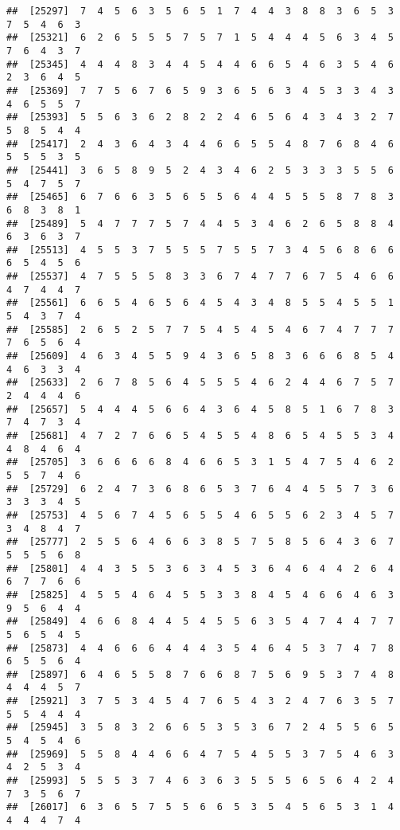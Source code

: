 \documentclass[
]{book}
\begin{document}
\begin{verbatim}
##  [25297]  7  4  5  6  3  5  6  5  1  7  4  4  3  8  8  3  6  5  3  7  5  4  6  3
##  [25321]  6  2  6  5  5  5  7  5  7  1  5  4  4  4  5  6  3  4  5  7  6  4  3  7
##  [25345]  4  4  4  8  3  4  4  5  4  4  6  6  5  4  6  3  5  4  6  2  3  6  4  5
##  [25369]  7  7  5  6  7  6  5  9  3  6  5  6  3  4  5  3  3  4  3  4  6  5  5  7
##  [25393]  5  5  6  3  6  2  8  2  2  4  6  5  6  4  3  4  3  2  7  5  8  5  4  4
##  [25417]  2  4  3  6  4  3  4  4  6  6  5  5  4  8  7  6  8  4  6  5  5  5  3  5
##  [25441]  3  6  5  8  9  5  2  4  3  4  6  2  5  3  3  3  5  5  6  5  4  7  5  7
##  [25465]  6  7  6  6  3  5  6  5  5  6  4  4  5  5  5  8  7  8  3  6  8  3  8  1
##  [25489]  5  4  7  7  7  5  7  4  4  5  3  4  6  2  6  5  8  8  4  6  3  6  3  7
##  [25513]  4  5  5  3  7  5  5  5  7  5  5  7  3  4  5  6  8  6  6  6  5  4  5  6
##  [25537]  4  7  5  5  5  8  3  3  6  7  4  7  7  6  7  5  4  6  6  4  7  4  4  7
##  [25561]  6  6  5  4  6  5  6  4  5  4  3  4  8  5  5  4  5  5  1  5  4  3  7  4
##  [25585]  2  6  5  2  5  7  7  5  4  5  4  5  4  6  7  4  7  7  7  7  6  5  6  4
##  [25609]  4  6  3  4  5  5  9  4  3  6  5  8  3  6  6  6  8  5  4  4  6  3  3  4
##  [25633]  2  6  7  8  5  6  4  5  5  5  4  6  2  4  4  6  7  5  7  2  4  4  4  6
##  [25657]  5  4  4  4  5  6  6  4  3  6  4  5  8  5  1  6  7  8  3  7  4  7  3  4
##  [25681]  4  7  2  7  6  6  5  4  5  5  4  8  6  5  4  5  5  3  4  4  8  4  6  4
##  [25705]  3  6  6  6  6  8  4  6  6  5  3  1  5  4  7  5  4  6  2  5  5  7  4  6
##  [25729]  6  2  4  7  3  6  8  6  5  3  7  6  4  4  5  5  7  3  6  3  3  3  4  5
##  [25753]  4  5  6  7  4  5  6  5  5  4  6  5  5  6  2  3  4  5  7  3  4  8  4  7
##  [25777]  2  5  5  6  4  6  6  3  8  5  7  5  8  5  6  4  3  6  7  5  5  5  6  8
##  [25801]  4  4  3  5  5  3  6  3  4  5  3  6  4  6  4  4  2  6  4  6  7  7  6  6
##  [25825]  4  5  5  4  6  4  5  5  3  3  8  4  5  4  6  6  4  6  3  9  5  6  4  4
##  [25849]  4  6  6  8  4  4  5  4  5  5  6  3  5  4  7  4  4  7  7  5  6  5  4  5
##  [25873]  4  4  6  6  6  4  4  4  3  5  4  6  4  5  3  7  4  7  8  6  5  5  6  4
##  [25897]  6  4  6  5  5  8  7  6  6  8  7  5  6  9  5  3  7  4  8  4  4  4  5  7
##  [25921]  3  7  5  3  4  5  4  7  6  5  4  3  2  4  7  6  3  5  7  5  5  4  4  4
##  [25945]  3  5  8  3  2  6  6  5  3  5  3  6  7  2  4  5  5  6  5  5  4  5  4  6
##  [25969]  5  5  8  4  4  6  6  4  7  5  4  5  5  3  7  5  4  6  3  4  2  5  3  4
##  [25993]  5  5  5  3  7  4  6  3  6  3  5  5  5  6  5  6  4  2  4  7  3  5  6  7
##  [26017]  6  3  6  5  7  5  5  6  6  5  3  5  4  5  6  5  3  1  4  4  4  4  7  4

\end{verbatim}
\end{document}
